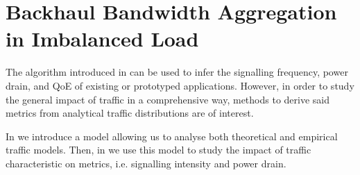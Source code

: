 \section{Backhaul Bandwidth Aggregation in Imbalanced Load}\label{sec:aggregation:performance_model}
The algorithm introduced in  can be used to infer the signalling frequency, power drain, and \gls{QoE} of existing or prototyped applications.
However, in order to study the general impact of traffic in a comprehensive way, methods to derive said metrics from analytical traffic distributions are of interest.

In  we introduce a model allowing us to
analyse both theoretical and empirical traffic models.
Then, in  we use this model to study the impact of traffic characteristic on metrics, i.e. signalling intensity and power drain.



